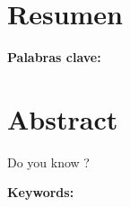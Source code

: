 \documentclass[12pt,oneside,a4paper]{book}
\begin{document}
\chapter*{Resumen}
\noindent \textbf{Palabras clave:} 

\chapter*{Abstract}
 Do you know ?
 
\noindent \textbf{Keywords:} 
%  
\tableofcontents    %







\printglossaries
\newpage

%
\listoffigures            
\listoftables            

\mainmatter

 














\appendix

\small
\small
\end{document}
